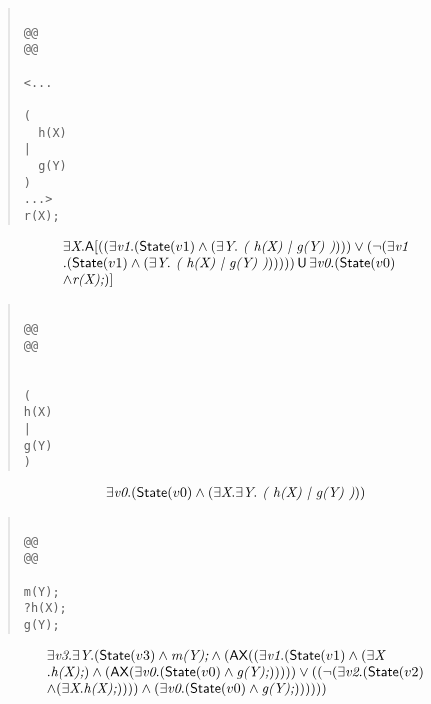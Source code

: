 \documentclass{article}
\newcommand{\U}{\,\mbox{\sf{U}}\,}
\newcommand{\A}{\mbox{\sf{A}}}
\newcommand{\AX}{\mbox{\sf{AX}}}
\newcommand{\mita}[1]{\mbox{\it{{#1}}}}
\newcommand{\msf}[1]{\mbox{\sf{{#1}}}}
\begin{document}
\begin{quote}\begin{verbatim}

@@
@@

<...
  
(
  h(X)
|
  g(Y)
)
...>
r(X);
\end{verbatim}\end{quote}

\[\begin{array}{l}
\exists \mita{X} . \A[((\exists \mita{v1} . (\msf{State}(v1) \wedge (\exists \mita{Y} . \mita{
(
h(X)
|
g(Y)
)}))) \vee (\neg (\exists \mita{v1}\\ . (\msf{State}(v1) \wedge (\exists \mita{Y} . \mita{
(
h(X)
|
g(Y)
)}))))) \U \exists \mita{v0} . (\msf{State}(v0)\\ \wedge \mita{r(X);})]

\end{array}\]

\begin{quote}\begin{verbatim}

@@
@@


(
h(X)
|
g(Y)
)
\end{verbatim}\end{quote}

\[\begin{array}{l}
\exists \mita{v0} . (\msf{State}(v0) \wedge (\exists \mita{X} . \exists \mita{Y} . \mita{
(
h(X)
|
g(Y)
)}))
\end{array}\]

\begin{quote}\begin{verbatim}

@@
@@

m(Y);
?h(X);
g(Y);
\end{verbatim}\end{quote}

\[\begin{array}{l}
\exists \mita{v3} . \exists \mita{Y} . (\msf{State}(v3) \wedge \mita{m(Y);} \wedge (\AX((\exists \mita{v1} . (\msf{State}(v1) \wedge (\exists \mita{X}\\ . \mita{h(X);}) \wedge (\AX(\exists \mita{v0} . (\msf{State}(v0) \wedge \mita{g(Y);}))))) \vee ((\neg (\exists \mita{v2} . (\msf{State}(v2)\\ \wedge (\exists \mita{X} . \mita{h(X);})))) \wedge (\exists \mita{v0} . (\msf{State}(v0) \wedge \mita{g(Y);}))))))
\end{array}\]
\end{document}
